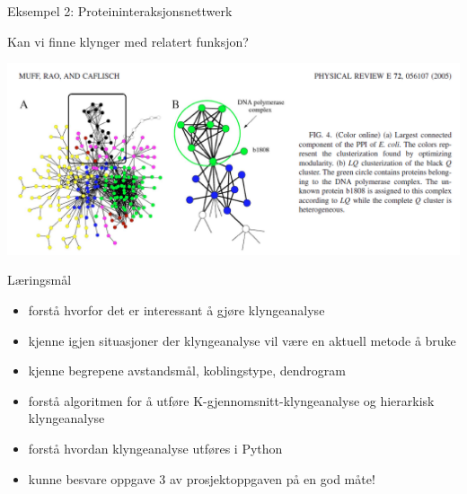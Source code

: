 \documentclass[10pt,ignorenonframetext,]{beamer}
\begin{document}
\begin{frame}{Eksempel 2: Proteininteraksjonsnettwerk}
\protect\hypertarget{eksempel-2-proteininteraksjonsnettwerk}{}

Kan vi finne klynger med relatert funksjon?

\includegraphics{muff_etal.png}

\end{frame}

\begin{frame}{Læringsmål}
\protect\hypertarget{luxe6ringsmuxe5l}{}

\begin{itemize}
\item
  forstå hvorfor det er interessant å gjøre klyngeanalyse
\item
  kjenne igjen situasjoner der klyngeanalyse vil være en aktuell metode
  å bruke
\item
  kjenne begrepene avstandsmål, koblingstype, dendrogram
\item
  forstå algoritmen for å utføre K-gjennomsnitt-klyngeanalyse og
  hierarkisk klyngeanalyse
\item
  forstå hvordan klyngeanalyse utføres i Python
\item
  kunne besvare oppgave 3 av prosjektoppgaven på en god måte!
\end{itemize}

\end{frame}
\end{document}

